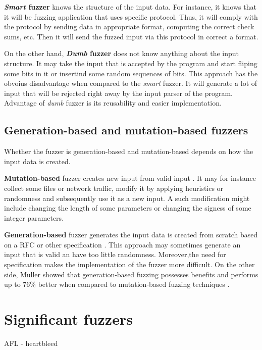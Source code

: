 \textbf{\emph{Smart} fuzzer} knows the structure of the input data. For instance, it knows that it will be fuzzing application that uses specific protocol. Thus, it will comply with the protocol by sending data in appropriate format, computing the correct check sums, etc. Then it will send the fuzzed input via this protocol in correct a format.

On the other hand, \textbf{\emph{Dumb} fuzzer} does not know anything about the input structure. It may take the input that is accepted by the program and start fliping some bits in it or insertind some random sequences of bits. This approach has the obvoius disadvantage when compared to the \emph{smart} fuzzer. It will generate a lot of input that will be rejected right away by the input parser of the program. Advantage of \emph{dumb} fuzzer is its reusability and easier implementation.

\subsection{Generation-based and mutation-based fuzzers}
\label{ssub:Generation-based and mutation-based fuzzers}
Whether the fuzzer is generation-based and mutation-based depends on how the input data is created.

\textbf{Mutation-based} fuzzer creates new input from valid input \cite{miller2007analysis}. It may for instance collect some files or network traffic, modify it by applying heuristics or randomness and subsequently use it as a new input. A such modification might include changing the length of some parameters or changing the signess of some integer parameters.

\textbf{Generation-based} fuzzer generates the input data is created from scratch based on a RFC or other specification \cite{miller2007analysis}. This approach may sometimes generate an input that is valid an have too little randomness. Moreover,the need for specification makes the implementation of the fuzzer more difficult. On the other side, Muller showed that generation-based fuzzing possesses benefits and performs up to 76\% better when compared to mutation-based fuzzing techniques \cite{miller2007analysis}.


\section{Significant fuzzers}
\label{ssub:Significant fuzzers}

AFL
- heartbleed

